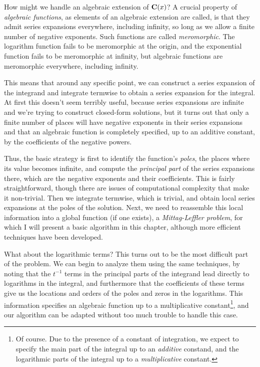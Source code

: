 How might we handle an algebraic extension of ${\bf C}(x)$?  A crucial
property of {\it algebraic functions}, as elements of an algebraic
extension are called, is that they admit series expansions everywhere,
including infinity, so long as we allow a finite number of negative
exponents.  Such functions are called {\it meromorphic}.  The
logarithm function fails to be meromorphic at the origin, and the
exponential function fails to be meromorphic at infinity, but
algebraic functions are meromorphic everywhere, including infinity.

This means that around any specific point, we can construct a series
expansion of the integrand and integrate termwise to obtain a series
expansion for the integral.  At first this doesn't seem terribly
useful, because series expansions are infinite and we're trying to
construct closed-form solutions, but it turns out that only a finite
number of places will have negative exponents in their series
expansions and that an algebraic function is completely specified, up to an
additive constant, by the coefficients of the negative powers.

Thus, the basic strategy is first to identify the function's {\it
poles}, the places where its value becomes infinite, and compute the
{\it principal part} of the series expansions there, which are the
negative exponents and their coefficients.  This is fairly
straightforward, though there are issues of computational complexity
that make it non-trivial.  Then we integrate termwise, which is
trivial, and obtain local series expansions at the poles of the
solution.  Next, we need to reassemble this local information into a
global function (if one exists), a {\it Mittag-Leffler problem}, for
which I will present a basic algorithm in this chapter, although more
efficient techniques have been developed.

What about the logarithmic terms?  This turns out to be the most
difficult part of the problem.  We can begin to analyze them using the
same techniques, by noting that the $t^{-1}$ terms in the principal
parts of the integrand lead directly to logarithms in the integral,
and furthermore that the coefficients of these terms give us the
locations and orders of the poles and zeros in the logarithms.  This
information specifies an algebraic function up to a multiplicative
constant\footnote{Of course.  Due to the presence of a constant of
integration, we expect to specify the main part of the integral up to
an {\it additive} constand, and the logarithmic parts of the integral
up to a {\it multiplicative} constant.}, and our algorithm can be
adapted without too much trouble to handle this case.

